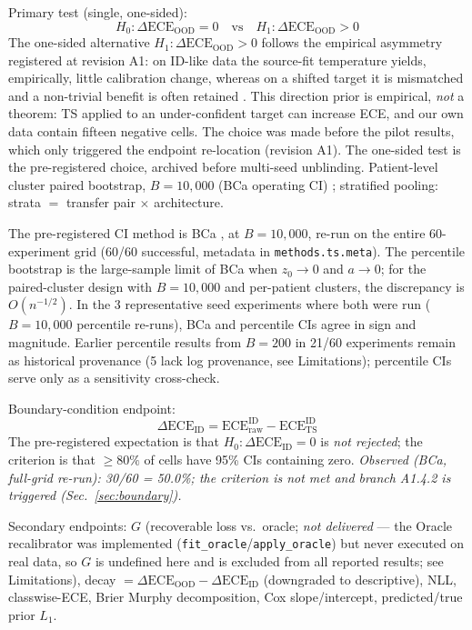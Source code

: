 \documentclass[review,12pt,nonatbib]{elsarticle}
\begin{document}
Primary test (single, one-sided):
\begin{equation}
    H_0: \Delta\text{ECE}_{\text{OOD}} = 0
    \quad\text{vs}\quad
    H_1: \Delta\text{ECE}_{\text{OOD}} > 0
\end{equation}
The one-sided alternative
$H_1: \Delta\text{ECE}_{\text{OOD}} > 0$ follows the empirical
asymmetry registered at revision A1: on ID-like data the source-fit
temperature yields, empirically, little calibration change, whereas
on a shifted target it is mismatched and a non-trivial benefit is
often retained \cite{guo2017calibration,ovadia2019calibration}. This
direction prior is empirical, \emph{not} a theorem: TS applied to an
under-confident target can increase ECE, and our own data contain
fifteen negative cells. The choice was made before the pilot results,
which only triggered the endpoint re-location (revision A1). The
one-sided test is the pre-registered choice, archived before
multi-seed unblinding.
Patient-level cluster paired bootstrap, $B=10{,}000$ (BCa
operating CI) \cite{efron1987bca}; stratified pooling: strata $=$ transfer pair
$\times$ architecture.

The pre-registered
CI method is BCa \cite{efron1987bca}, at $B=10{,}000$,
re-run on the entire 60-experiment grid (60/60 successful, metadata
in \texttt{methods.ts.meta}). The percentile bootstrap is the
large-sample limit of BCa when $z_0\to 0$ and $a\to 0$; for the
paired-cluster design with $B=10{,}000$ and per-patient clusters,
the discrepancy is $O(n^{-1/2})$. In the 3 representative seed
experiments where both were run ($B=10{,}000$ percentile re-runs),
BCa and percentile CIs agree in sign and magnitude. Earlier
percentile results from $B=200$ in 21/60 experiments remain as
historical provenance (5 lack log provenance, see Limitations);
percentile CIs serve only as a sensitivity cross-check.

Boundary-condition endpoint:
\begin{equation}
    \Delta\text{ECE}_{\text{ID}}
    = \text{ECE}_{\mathrm{raw}}^{\mathrm{ID}} - \text{ECE}_{\mathrm{TS}}^{\mathrm{ID}}
\end{equation}
The pre-registered expectation is that $H_0: \Delta\text{ECE}_{\text{ID}} = 0$ is \emph{not rejected};
the criterion is that $\geq 80\%$ of cells have 95\% CIs containing zero.
\emph{Observed (BCa, full-grid re-run): 30/60 = 50.0\%; the criterion is
not met and branch A1.4.2 is triggered (Sec.~\ref{sec:boundary}).}

Secondary endpoints: $G$ (recoverable loss vs.\ oracle; \emph{not
delivered} --- the Oracle recalibrator was implemented
(\texttt{fit\_oracle}/\texttt{apply\_oracle}) but never executed on real
data, so $G$ is undefined here and is excluded from all reported
results; see Limitations), decay
$=\Delta\text{ECE}_{\text{OOD}}-\Delta\text{ECE}_{\text{ID}}$
(downgraded to descriptive), NLL, classwise-ECE, Brier Murphy
decomposition, Cox slope/intercept, predicted/true prior $L_1$.
\end{document}
